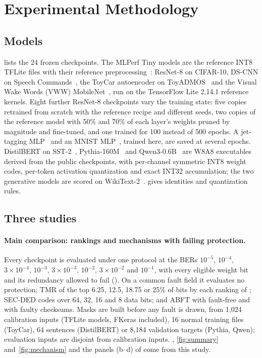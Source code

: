 \section{Experimental Methodology}\label{sec:experiments}
\subsection{Models}
 lists the 24 frozen checkpoints. The MLPerf Tiny models are the reference INT8 TFLite files with their reference preprocessing~\cite{banbury2021mlperf,mlcommons2026tiny}: ResNet-8 on CIFAR-10, DS-CNN on Speech Commands~\cite{warden2018speechcommands}, the ToyCar autoencoder on ToyADMOS~\cite{koizumi2019toyadmos} and the Visual Wake Words (VWW) MobileNet~\cite{chowdhery2019visual}, run on the TensorFlow Lite 2.14.1 reference kernels. Eight further ResNet-8 checkpoints vary the training state: five copies retrained from scratch with the reference recipe and different seeds, two copies of the reference model with 50\% and 70\% of each layer's weights pruned by magnitude and fine-tuned, and one trained for 100 instead of 500 epochs. A jet-tagging MLP~\cite{duarte2018fast} and an MNIST MLP~\cite{lecun1998gradient}, trained here, are saved at several epochs. DistilBERT on SST-2~\cite{sanh2019distilbert,socher2013sentiment}, Pythia-160M~\cite{biderman2023pythia} and Qwen3-0.6B~\cite{yang2025qwen3} are W8A8 executables derived from the public checkpoints, with per-channel symmetric INT8 weight codes, per-token activation quantization and exact INT32 accumulation; the two generative models are scored on WikiText-2~\cite{merity2017pointer}.  gives identities and quantization rules.

\subsection{Three studies}
\paragraph{Main comparison: rankings and mechanisms with failing protection.} Every checkpoint is evaluated under one protocol at the BERs $10^{-5}$, $10^{-4}$, $3\!\times\!10^{-4}$, $10^{-3}$, $3\!\times\!10^{-3}$, $10^{-2}$, $3\!\times\!10^{-2}$ and $10^{-1}$, with every eligible weight bit and its redundancy allowed to fail (). On a common fault field it evaluates no protection; TMR of the top 6.25, 12.5, 18.75 or 25\% of bits by each ranking of ; SEC-DED codes over 64, 32, 16 and 8 data bits; and ABFT with fault-free and with faulty checksums. Masks are built before any fault is drawn, from 1,024 calibration inputs (TFLite models, FKeras included), 16 normal training files (ToyCar), 64 sentences (DistilBERT) or 8,184 validation targets (Pythia, Qwen); evaluation inputs are disjoint from calibration inputs. , \ref{fig:summary} and~\ref{fig:mechanism} and the panels (b--d) of  come from this study.

